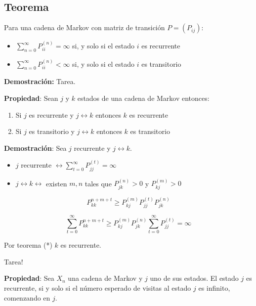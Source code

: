 \documentclass[12pt,a4paper]{article}
\begin{document}
\subsection*{Teorema}

Para una cadena de Markov con matriz de transición $P = (P_{ij})$:

\begin{itemize}
    \item $\sum_{n=0}^{\infty} P_{ii}^{(n)} = \infty$ si, y solo si el estado $i$ es recurrente
    \item $\sum_{n=0}^{\infty} P_{ii}^{(n)} < \infty$ si, y solo si el estado $i$ es transitorio
\end{itemize}

\textbf{Demostración:} Tarea.

\textbf{Propiedad}: Sean $j$ y $k$ estados de una cadena de Markov entonces:

\begin{enumerate}
    \item Si $j$ es recurrente y $j \leftrightarrow k$ entonces $k$ es recurrente
    \item Si $j$ es transitorio y $j \leftrightarrow k$ entonces $k$ es transitorio
\end{enumerate}

\textbf{Demostración}: Sea $j$ recurrente y $j \leftrightarrow k$.

\begin{itemize}
    \item $j$ recurrente $\leftrightarrow \sum_{t=0}^{\infty} P_{jj}^{(t)} = \infty$
    \item $j \leftrightarrow k \leftrightarrow$ existen $m, n$ tales que $P_{jk}^{(n)} > 0$ y $P_{kj}^{(m)} > 0$
\end{itemize}

\begin{equation*}
P_{kk}^{n+m+t} \geq P_{kj}^{(m)} P_{jj}^{(t)} P_{jk}^{(n)}
\end{equation*}

\begin{equation*}
\sum_{t=0}^{\infty} P_{kk}^{n+m+t} \geq P_{kj}^{(m)} P_{jk}^{(n)} \sum_{t=0}^{\infty} P_{jj}^{(t)} = \infty
\end{equation*}

Por teorema (*) $k$ es recurrente.

Tarea!

\textbf{Propiedad}: Sea $X_n$ una cadena de Markov y $j$ uno de sus estados. El estado $j$ es recurrente, si y solo si el número esperado de visitas al estado $j$ es infinito, comenzando en $j$.
\end{document}
